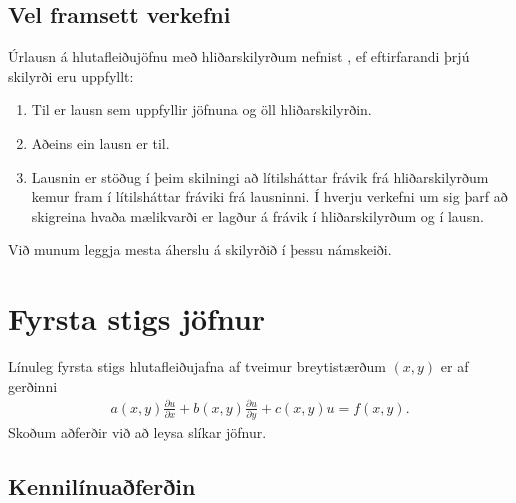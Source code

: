 \documentclass[a4paper,10pt,icelandic]{sphinxmanual}
\begin{document}
\subsection{Vel framsett verkefni}
\label{\detokenize{Kafli01:vel-framsett-verkefni}}
Úrlausn á hlutafleiðujöfnu með hliðarskilyrðum nefnist , ef eftirfarandi
þrjú skilyrði eru uppfyllt:
\begin{enumerate}
\def\theenumi{\arabic{enumi}}
\def\labelenumi{\theenumi .}
\makeatletter\def\p@enumii{\p@enumi \theenumi .}\makeatother
\item {} 
 Til er lausn sem uppfyllir jöfnuna og öll hliðarskilyrðin.

\item {} 
 Aðeins ein lausn er til.

\item {} 
 Lausnin er stöðug í þeim skilningi að lítilsháttar frávik frá hliðarskilyrðum kemur fram í lítilsháttar fráviki frá lausninni. Í hverju verkefni um sig þarf að skigreina hvaða mælikvarði er lagður á frávik í hliðarskilyrðum og í lausn.

\end{enumerate}

Við munum leggja mesta áherslu á skilyrðið  í þessu námskeiði.


\section{Fyrsta stigs jöfnur}
\label{\detokenize{Kafli01:fyrsta-stigs-jofnur}}
Línuleg fyrsta stigs hlutafleiðujafna af tveimur breytistærðum \((x,y)\) er af gerðinni
\begin{equation*}
\begin{split}a(x,y)\frac{\partial u}{\partial x} + b(x,y) \frac{\partial u}{\partial y} + c(x,y)u = f(x,y).\end{split}
\end{equation*}
Skoðum aðferðir við að leysa slíkar jöfnur.


\subsection{Kennilínuaðferðin}
\label{\detokenize{Kafli01:kennilinuaferin}}
\end{document}
